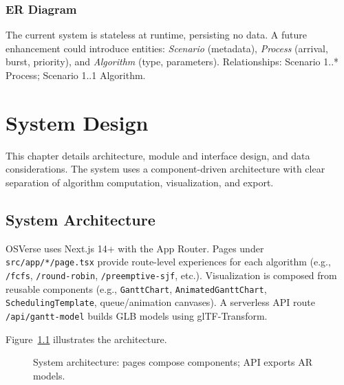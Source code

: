 \documentclass[12pt,a4paper,oneside]{report}
\begin{document}
\subsection{ER Diagram}
The current system is stateless at runtime, persisting no data. A future enhancement could introduce entities: \textit{Scenario} (metadata), \textit{Process} (arrival, burst, priority), and \textit{Algorithm} (type, parameters). Relationships: Scenario 1..* Process; Scenario 1..1 Algorithm.

\chapter{System Design}
\noindent This chapter details architecture, module and interface design, and data considerations. The system uses a component-driven architecture with clear separation of algorithm computation, visualization, and export.

\section{System Architecture}
OSVerse uses Next.js 14+ with the App Router. Pages under \verb|src/app/*/page.tsx| provide route-level experiences for each algorithm (e.g., \verb|/fcfs|, \verb|/round-robin|, \verb|/preemptive-sjf|, etc.). Visualization is composed from reusable components (e.g., \verb|GanttChart|, \verb|AnimatedGanttChart|, \verb|SchedulingTemplate|, queue/animation canvases). A serverless API route \verb|/api/gantt-model| builds GLB models using glTF-Transform.

Figure~\ref{fig:arch} illustrates the architecture.

\begin{figure}[H]
  \centering
  \caption{System architecture: pages compose components; API exports AR models.}
  \label{fig:arch}
\end{figure}
\end{document}
